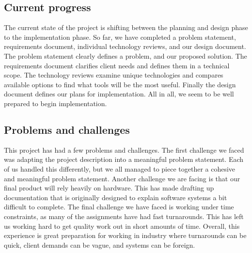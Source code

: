 \subsection{Current progress}
    The current state of the project is shifting between the planning and design phase to the implementation phase.
    So far, we have completed a problem statement, requirements document, individual technology reviews, and our design document.
    The problem statement clearly defines a problem, and our proposed solution. The requirements document clarifies client needs and defines them in a technical scope.
    The technology reviews examine unique technologies and compares available options to find what tools will be the most useful.
    Finally the design document defines our plans for implementation. All in all, we seem to be well prepared to begin implementation.

\subsection{Problems and challenges}
    This project has had a few problems and challenges.
    The first challenge we faced was adapting the project description into a meaningful problem statement.
    Each of us handled this differently, but we all managed to piece together a cohesive and meaningful problem statement.
    Another challenge we are facing is that our final product will rely heavily on hardware.
    This has made drafting up documentation that is originally designed to explain software systems a bit difficult to complete.
    The final challenge we have faced is working under time constraints, as many of the assignments have had fast turnarounds. This has left us working hard to get quality work out in short amounts of time. Overall, this experience is great preparation for working in industry where turnarounds can be quick, client demands can be vague, and systems can be foreign.